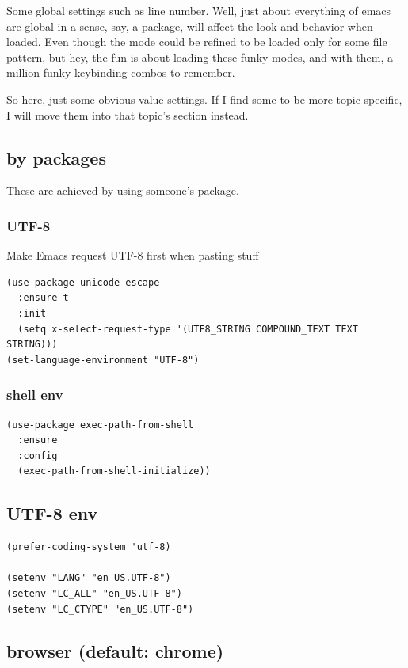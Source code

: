 \documentclass[11pt]{article}
\begin{document}
Some global settings such as line number. Well, just about everything
of emacs are global in a sense, say, a package, will affect the look
and behavior when loaded. Even though the mode could be refined to be
loaded only for some file pattern, but hey, the fun is about loading
these funky modes, and with them, a million funky keybinding combos to
remember.

So here, just some obvious value settings. If I find some to be more
topic specific, I will move them into that topic's section instead.

\subsection{by packages}
\label{sec:org8960995}

These are achieved by using someone's package.

\subsubsection{UTF-8}
\label{sec:org1e1157b}

Make Emacs request UTF-8 first when pasting stuff

\begin{verbatim}
(use-package unicode-escape
  :ensure t
  :init
  (setq x-select-request-type '(UTF8_STRING COMPOUND_TEXT TEXT STRING)))
(set-language-environment "UTF-8")
\end{verbatim}

\subsubsection{shell env}
\label{sec:org209f78f}

\begin{verbatim}
(use-package exec-path-from-shell
  :ensure
  :config
  (exec-path-from-shell-initialize))
\end{verbatim}
\subsection{UTF-8 env}
\label{sec:org9f83a1e}
\begin{verbatim}
(prefer-coding-system 'utf-8)

(setenv "LANG" "en_US.UTF-8")
(setenv "LC_ALL" "en_US.UTF-8")
(setenv "LC_CTYPE" "en_US.UTF-8")
\end{verbatim}
\subsection{browser (default: chrome)}
\label{sec:org2521a0b}
\end{document}

